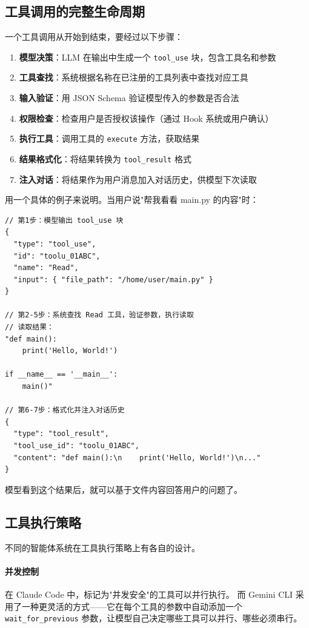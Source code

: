 \subsection{工具调用的完整生命周期}

一个工具调用从开始到结束，要经过以下步骤：

\begin{enumerate}
    \item \textbf{模型决策}：LLM 在输出中生成一个 \texttt{tool\_use} 块，包含工具名和参数
    \item \textbf{工具查找}：系统根据名称在已注册的工具列表中查找对应工具
    \item \textbf{输入验证}：用 JSON Schema 验证模型传入的参数是否合法
    \item \textbf{权限检查}：检查用户是否授权该操作（通过 Hook 系统或用户确认）
    \item \textbf{执行工具}：调用工具的 \texttt{execute} 方法，获取结果
    \item \textbf{结果格式化}：将结果转换为 \texttt{tool\_result} 格式
    \item \textbf{注入对话}：将结果作为用户消息加入对话历史，供模型下次读取
\end{enumerate}

用一个具体的例子来说明。当用户说"帮我看看 main.py 的内容"时：

\begin{verbatim}
// 第1步：模型输出 tool_use 块
{
  "type": "tool_use",
  "id": "toolu_01ABC",
  "name": "Read",
  "input": { "file_path": "/home/user/main.py" }
}

// 第2-5步：系统查找 Read 工具，验证参数，执行读取
// 读取结果：
"def main():
    print('Hello, World!')

if __name__ == '__main__':
    main()"

// 第6-7步：格式化并注入对话历史
{
  "type": "tool_result",
  "tool_use_id": "toolu_01ABC",
  "content": "def main():\n    print('Hello, World!')\n..."
}
\end{verbatim}

模型看到这个结果后，就可以基于文件内容回答用户的问题了。

\subsection{工具执行策略}

不同的智能体系统在工具执行策略上有各自的设计。

\paragraph{并发控制}
在 Claude Code 中，标记为"并发安全"的工具可以并行执行。
而 Gemini CLI 采用了一种更灵活的方式——它在每个工具的参数中自动添加一个
\texttt{wait\_for\_previous} 参数，让模型自己决定哪些工具可以并行、哪些必须串行。

